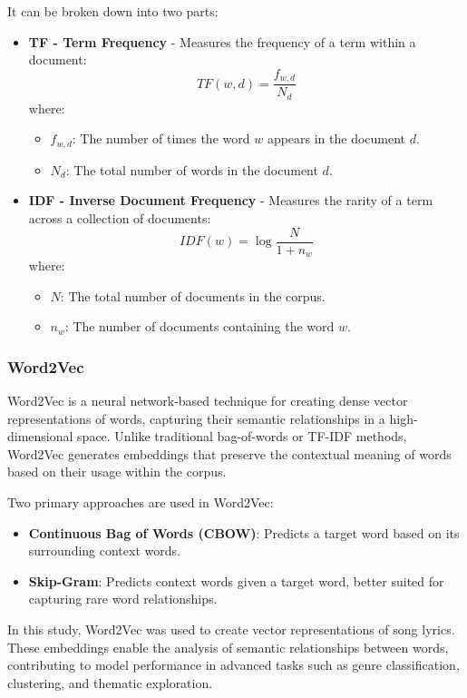 It can be broken down into two parts:


\begin{itemize}
  \item \textbf{TF - Term Frequency} - Measures the frequency of a term within
    a document:
  \[
  TF(w, d) = \frac{f_{w, d}}{N_d}
  \]
  where:
  \begin{itemize}
    \item \( f_{w, d} \): The number of times the word \( w \) appears in the
      document \( d \).
    \item \( N_d \): The total number of words in the document \( d \).
  \end{itemize}

  \item \textbf{IDF - Inverse Document Frequency} - Measures the rarity of a
    term across a collection of documents:
  \[
  IDF(w) = \log{\frac{N}{1 + n_w}}
  \]
  where:
  \begin{itemize}
    \item \( N \): The total number of documents in the corpus.
    \item \( n_w \): The number of documents containing the word \( w \).
  \end{itemize}
\end{itemize}

\subsubsection*{Word2Vec}

Word2Vec\cite{w2v} is a neural network-based technique for creating dense
vector representations of words, capturing their semantic relationships in a
high-dimensional space. Unlike traditional bag-of-words or TF-IDF methods,
Word2Vec generates embeddings that preserve the contextual meaning of words
based on their usage within the corpus.

Two primary approaches are used in Word2Vec: 
\begin{itemize} 
  \item \textbf{Continuous Bag of Words (CBOW)}: Predicts a target word based
    on its surrounding context words. 
  \item \textbf{Skip-Gram}: Predicts context words given a target word, better
    suited for capturing rare word relationships.
\end{itemize}

In this study, Word2Vec was used to create vector representations of song
lyrics. These embeddings enable the analysis of semantic relationships between
words, contributing to model performance in advanced tasks such as genre
classification, clustering, and thematic exploration.



